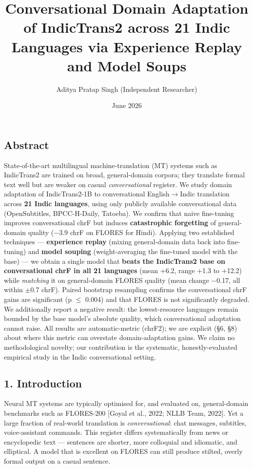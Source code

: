 \documentclass[
  11pt,
]{article}
\title{Conversational Domain Adaptation of IndicTrans2 across 21 Indic
Languages via Experience Replay and Model Soups}
\author{Aditya Pratap Singh (Independent Researcher)}
\date{June 2026}
\begin{document}
\maketitle

\hypertarget{abstract}{%
\subsection{Abstract}\label{abstract}}

State-of-the-art multilingual machine-translation (MT) systems such as
IndicTrans2 are trained on broad, general-domain corpora; they translate
formal text well but are weaker on casual \emph{conversational}
register. We study domain adaptation of IndicTrans2-1B to conversational
English$\to$Indic translation across \textbf{21 Indic languages}, using only
publicly available conversational data (OpenSubtitles, BPCC-H-Daily,
Tatoeba). We confirm that naive fine-tuning improves conversational chrF
but induces \textbf{catastrophic forgetting} of general-domain quality
($-$3.9 chrF on FLORES for Hindi). Applying two established techniques ---
\textbf{experience replay} (mixing general-domain data back into
fine-tuning) and \textbf{model souping} (weight-averaging the fine-tuned
model with the base) --- we obtain a single model that \textbf{beats the
IndicTrans2 base on conversational chrF in all 21 languages} (mean +6.2,
range +1.3 to +12.2) while \emph{matching} it on general-domain FLORES
quality (mean change $-$0.17, all within $\pm$0.7 chrF). Paired bootstrap
resampling confirms the conversational chrF gains are significant (p $\le$
0.004) and that FLORES is not significantly degraded. We additionally
report a negative result: the lowest-resource languages remain bounded
by the base model's absolute quality, which conversational adaptation
cannot raise. All results are automatic-metric (chrF2); we are explicit
(§6, §8) about where this metric can overstate domain-adaptation gains.
We claim no methodological novelty; our contribution is the systematic,
honestly-evaluated empirical study in the Indic conversational setting.

\hypertarget{introduction}{%
\subsection{1. Introduction}\label{introduction}}

Neural MT systems are typically optimised for, and evaluated on,
general-domain benchmarks such as FLORES-200 {[}Goyal et al., 2022; NLLB
Team, 2022{]}. Yet a large fraction of real-world translation is
\emph{conversational}: chat messages, subtitles, voice-assistant
commands. This register differs systematically from news or encyclopedic
text --- sentences are shorter, more colloquial and idiomatic, and
elliptical. A model that is excellent on FLORES can still produce
stilted, overly formal output on a casual sentence.
\end{document}
